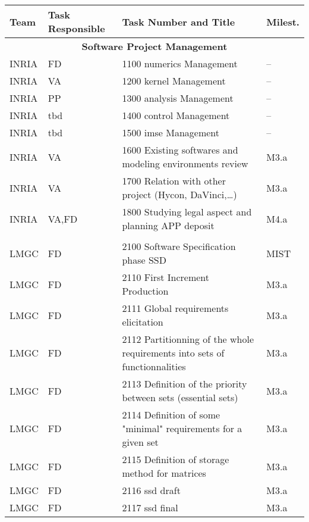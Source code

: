 \renewcommand{\arraystretch}{0.95}
\begin{longtable}{|l|l|l|l|}
  \hline
  \rowcolor[gray]{.8} Team & Task Responsible & Task Number and Title & Milest. \\
  \hline
  \endhead
  \multicolumn{4}{|c|}{\textbf{\scriptsize Software Project Management}}\\
  \hline 
  INRIA & FD &   1100 \ac{numerics} Management       & -- \\ \hline
  INRIA & VA &   1200 \ac{kernel} Management      & -- \\ \hline
  INRIA & PP &   1300 \ac{analysis} Management    & -- \\ \hline
  INRIA & \ac{tbd}  &   1400 \ac{control} Management       & -- \\ \hline
  INRIA & \ac{tbd}  &   1500  \ac{imse} Management     & -- \\ \hline
  INRIA & VA &   1600 Existing softwares and modeling environments review       & M3.a \\ \hline
  INRIA & VA &   1700 Relation with other project (Hycon, DaVinci,\dots)        & M3.a \\ \hline
  INRIA & VA,FD &   1800 Studying legal aspect and planning APP deposit    & M4.a \\ \hline
  \pagebreak
  \multicolumn{4}{|c|}{\textbf{\scriptsize Siconos/Numerics Software Production}} \\  \hline  
  LMGC & FD &   2100 Software Specification phase SSD   & MIST \\ \hline
  LMGC & FD &   2110 First Increment Production         & M3.a \\ \hline
  LMGC & FD &   2111 Global requirements elicitation    & M3.a \\ \hline
  LMGC & FD &   2112 Partitionning of the whole requirements into sets of functionnalities      & M3.a \\ \hline
  LMGC & FD &   2113 Definition of the priority between sets (essential sets)                   & M3.a \\ \hline
  LMGC & FD &   2114 Definition of some "minimal" requirements for a given set                  & M3.a \\ \hline
  LMGC & FD &   2115 Definition of storage method for matrices  & M3.a \\ \hline
  LMGC & FD &   2116 \ac{ssd} draft                             & M3.a \\ \hline
  LMGC & FD &   2117 \ac{ssd} final                     & M3.a \\ \hline

\end{longtable}
